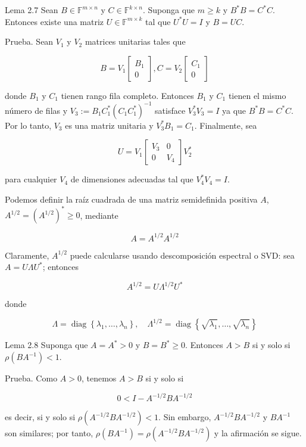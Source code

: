 Lema 2.7 Sean $B \in \mathbb{F}^{m \times n}$ y $C \in \mathbb{F}^{k \times n}$. Suponga que $m \geq k$ y $B^{*} B=C^{*} C$. Entonces existe una matriz $U \in \mathbb{F}^{m \times k}$ tal que $U^{*} U=I$ y $B=U C$.

Prueba. Sean $V_{1}$ y $V_{2}$ matrices unitarias tales que

$$
B=V_{1}\left[\begin{array}{c}
B_{1} \\
0
\end{array}\right], C=V_{2}\left[\begin{array}{c}
C_{1} \\
0
\end{array}\right]
$$

donde $B_{1}$ y $C_{1}$ tienen rango fila completo. Entonces $B_{1}$ y $C_{1}$ tienen el mismo número de filas y $V_{3}:=B_{1} C_{1}^{*}\left(C_{1} C_{1}^{*}\right)^{-1}$ satisface $V_{3}^{*} V_{3}=I$ ya que $B^{*} B=C^{*} C$. Por lo tanto, $V_{3}$ es una matriz unitaria y $V_{3}^{*} B_{1}=C_{1}$. Finalmente, sea

$$
U=V_{1}\left[\begin{array}{cc}
V_{3} & 0 \\
0 & V_{4}
\end{array}\right] V_{2}^{*}
$$

para cualquier $V_{4}$ de dimensiones adecuadas tal que $V_{4}^{*} V_{4}=I$.

Podemos definir la raíz cuadrada de una matriz semidefinida positiva $A$, $A^{1 / 2}=\left(A^{1 / 2}\right)^{*} \geq 0$, mediante

$$
A=A^{1 / 2} A^{1 / 2}
$$

Claramente, $A^{1 / 2}$ puede calcularse usando descomposición espectral o SVD: sea $A=U \Lambda U^{*}$; entonces

$$
A^{1 / 2}=U \Lambda^{1 / 2} U^{*}
$$

donde

$$
\Lambda=\operatorname{diag}\left\{\lambda_{1}, \ldots, \lambda_{n}\right\}, \quad \Lambda^{1 / 2}=\operatorname{diag}\left\{\sqrt{\lambda_{1}}, \ldots, \sqrt{\lambda_{n}}\right\}
$$

Lema 2.8 Suponga que $A=A^{*}>0$ y $B=B^{*} \geq 0$. Entonces $A>B$ si y solo si $\rho\left(B A^{-1}\right)<1$.

Prueba. Como $A>0$, tenemos $A>B$ si y solo si

$$
0<I-A^{-1 / 2} B A^{-1 / 2}
$$

es decir, si y solo si $\rho\left(A^{-1 / 2} B A^{-1 / 2}\right)<1$. Sin embargo, $A^{-1 / 2} B A^{-1 / 2}$ y $B A^{-1}$ son similares; por tanto, $\rho\left(B A^{-1}\right)=\rho\left(A^{-1 / 2} B A^{-1 / 2}\right)$ y la afirmación se sigue.

